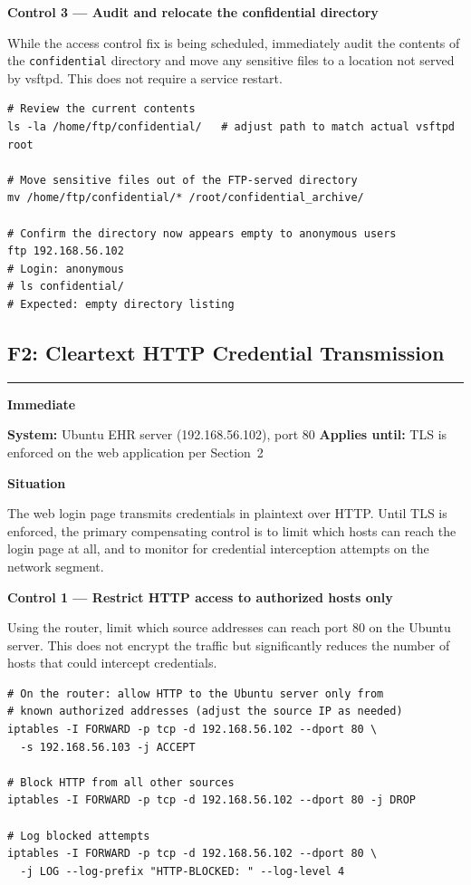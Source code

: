 \documentclass[12pt]{article}
\newcommand{\tfbadge}[2]{%
  \colorbox{#1}{\color{white}\textbf{\small #2}}%
}
\newcommand{\sectionrule}{%
  \vspace{4pt}\noindent\textcolor{headercol}{\rule{\linewidth}{0.8pt}}\vspace{4pt}%
}
\begin{document}
\bigskip
\noindent\textbf{Control 3 --- Audit and relocate the confidential directory}
 
While the access control fix is being scheduled, immediately audit the
contents of the \texttt{confidential} directory and move any sensitive files
to a location not served by vsftpd. This does not require a service restart.
 
\begin{lstlisting}[style=terminal]
# Review the current contents
ls -la /home/ftp/confidential/   # adjust path to match actual vsftpd root
 
# Move sensitive files out of the FTP-served directory
mv /home/ftp/confidential/* /root/confidential_archive/
 
# Confirm the directory now appears empty to anonymous users
ftp 192.168.56.102
# Login: anonymous
# ls confidential/
# Expected: empty directory listing
\end{lstlisting}
 
\subsection{F2: Cleartext HTTP Credential Transmission}
\sectionrule
 
\noindent\tfbadge{immediatecol}{Immediate}
\quad\textbf{System:} Ubuntu EHR server (192.168.56.102), port 80
\quad\textbf{Applies until:} TLS is enforced on the web application per
Section~2
 
\bigskip
\noindent\textbf{Situation}
 
The web login page transmits credentials in plaintext over HTTP. Until TLS
is enforced, the primary compensating control is to limit which hosts can
reach the login page at all, and to monitor for credential interception
attempts on the network segment.
 
\bigskip
\noindent\textbf{Control 1 --- Restrict HTTP access to authorized hosts only}
 
Using the router, limit which source addresses can reach port 80 on the
Ubuntu server. This does not encrypt the traffic but significantly reduces
the number of hosts that could intercept credentials.
 
\begin{lstlisting}[style=terminal]
# On the router: allow HTTP to the Ubuntu server only from
# known authorized addresses (adjust the source IP as needed)
iptables -I FORWARD -p tcp -d 192.168.56.102 --dport 80 \
  -s 192.168.56.103 -j ACCEPT
 
# Block HTTP from all other sources
iptables -I FORWARD -p tcp -d 192.168.56.102 --dport 80 -j DROP
 
# Log blocked attempts
iptables -I FORWARD -p tcp -d 192.168.56.102 --dport 80 \
  -j LOG --log-prefix "HTTP-BLOCKED: " --log-level 4
\end{lstlisting}
 
\end{document}
